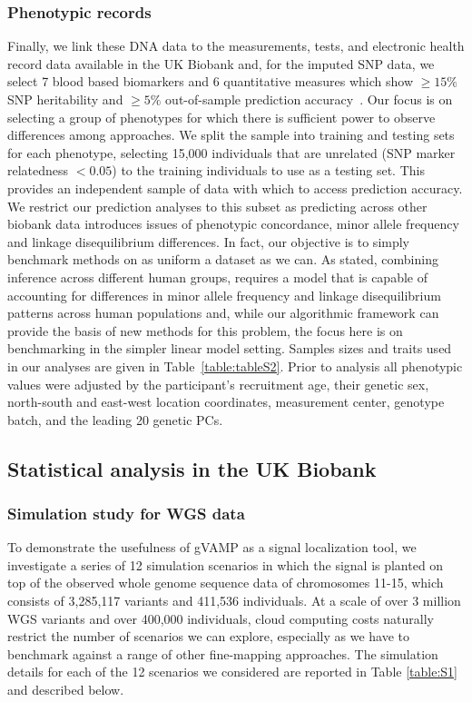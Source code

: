 \subsubsection{Phenotypic records}
Finally, we link these DNA data to the measurements, tests, and electronic health record data available in the UK Biobank \cite{Bycroft2018} and, for the imputed SNP data, we select 7 blood based biomarkers and 6 quantitative measures which show $\geq 15\%$ SNP heritability and $\geq 5\%$ out-of-sample prediction accuracy~\cite{Orliac2022}. Our focus is on selecting a group of phenotypes for which there is sufficient power to observe differences among approaches. We split the sample into training and testing sets for each phenotype, selecting 15,000 individuals that are unrelated (SNP marker relatedness $<0.05$) to the training individuals to use as a testing set. This provides an independent sample of data with which to access prediction accuracy. We restrict our prediction analyses to this subset as predicting across other biobank data introduces issues of phenotypic concordance, minor allele frequency and linkage disequilibrium differences. In fact, our objective is to simply benchmark methods on as uniform a dataset as we can. As stated, combining inference across different human groups, requires a model that is capable of accounting for differences in minor allele frequency and linkage disequilibrium patterns across human populations and, while our algorithmic framework can provide the basis of new methods for this problem, the focus here is on benchmarking in the simpler linear model setting. Samples sizes and traits used in our analyses are given in Table~\ref{table:tableS2}. Prior to analysis all phenotypic values were adjusted by the participant's recruitment age, their genetic sex, north-south and east-west location coordinates, measurement center, genotype batch, and the leading 20 genetic PCs.

\subsection{Statistical analysis in the UK Biobank}
\subsubsection{Simulation study for WGS data}
To demonstrate the usefulness of gVAMP as a signal localization tool, we investigate a series of 12 simulation scenarios in which the signal is planted on top of the observed whole genome sequence data of chromosomes 11-15, which consists of 3,285,117 variants and 411,536 individuals. At a scale of over 3 million WGS variants and over 400,000 individuals, cloud computing costs naturally restrict the number of scenarios we can explore, especially as we have to benchmark against a range of other fine-mapping approaches. The simulation details for each of the 12 scenarios we considered are reported in Table \ref{table:S1} and described below.

